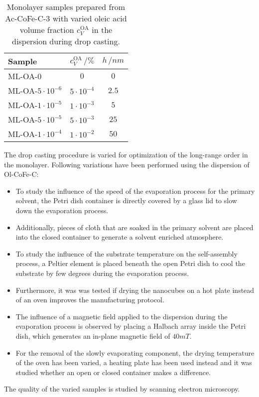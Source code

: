 \documentclass[\main/dresen_thesis.tex]{subfiles}
\begin{document}
      \begin{table}[!htbp]
        \centering
        \caption{\label{tab:monolayers:charMethod:OAVariation}Monolayer samples prepared from Ac-CoFe-C-3 with varied oleic acid volume fraction $c_V^\mathrm{OA}$ in the dispersion during drop casting.}
        \begin{tabular}{ l | c | c}
          \textbf{Sample} & $c_V^\mathrm{OA} \, / \unit{\%}$ & $h \, / \unit{nm}$\\
          \hline
          ML-OA-$0$               & $0$                      & $0$\\
          ML-OA-$5 \cdot 10^{-6}$ & $5 \cdot 10^{-4}$        & $2.5$\\
          ML-OA-$1 \cdot 10^{-5}$ & $1 \cdot 10^{-3}$        & $5$\\
          ML-OA-$5 \cdot 10^{-5}$ & $5 \cdot 10^{-3}$        & $25$\\
          ML-OA-$1 \cdot 10^{-4}$ & $1 \cdot 10^{-2}$        & $50$\\
          \hline
        \end{tabular}
      \end{table}

      The drop casting procedure is varied for optimization of the long-range order in the monolayer.
      Following variations have been performed using the dispersion of Ol-CoFe-C:
      \begin{itemize}
        \item To study the influence of the speed of the evaporation process for the primary solvent, the Petri dish container is directly covered by a glass lid to slow down the evaporation process. %

        \item Additionally, pieces of cloth that are soaked in the primary solvent are placed into the closed container to generate a solvent enriched atmosphere. %

        \item To study the influence of the substrate temperature on the self-assembly process, a Peltier element is placed beneath the open Petri dish to cool the substrate by few degrees during the evaporation process. %

        \item Furthermore, it was was tested if drying the nanocubes on a hot plate instead of an oven improves the manufacturing protocol.

        \item The influence of a magnetic field applied to the dispersion during the evaporation process is observed by placing a Halbach array inside the Petri dish, which generates an in-plane magnetic field of $40 \unit{mT}$.

        \item For the removal of the slowly evaporating component, the drying temperature of the oven has been varied, a heating plate has been used instead and it was studied whether an open or closed container makes a difference.
      \end{itemize}
      The quality of the varied samples is studied by scanning electron microscopy.
\end{document}

